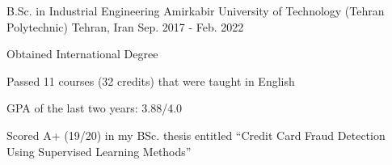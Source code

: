 

\begin{cventries}

  \cventry
    {B.Sc. in Industrial Engineering} %
    {Amirkabir University of Technology (Tehran Polytechnic)} %
    {Tehran, Iran} %
    {Sep. 2017 - Feb. 2022} %
    {
      \begin{cvitems} %
        \item {Obtained International Degree}
        \item {Passed 11 courses (32 credits) that were taught in English}
        \item {GPA of the last two years: 3.88/4.0}
        \item {Scored A+ (19/20) in my BSc. thesis entitled ``Credit Card Fraud Detection Using Supervised Learning Methods''}
      \end{cvitems}
    }

\end{cventries}
